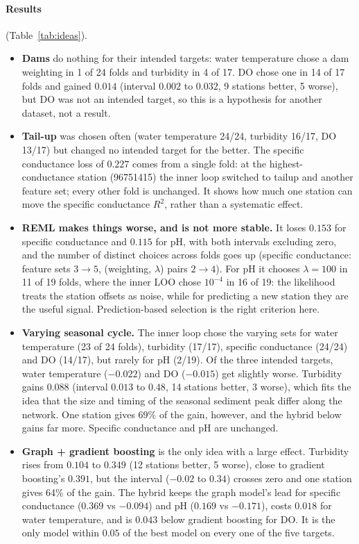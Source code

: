\documentclass[11pt]{article}
\newcommand{\codeus}{\textunderscore\allowbreak}
\newcommand{\code}[1]{{\ttfamily\let\_\codeus #1}}
\begin{document}
\paragraph{Results} (Table~\ref{tab:ideas}).
\begin{itemize}
  \item \textbf{Dams} do nothing for their intended targets: water temperature chose a dam
        weighting in 1 of 24 folds and turbidity in 4 of 17. DO chose one in 14 of 17 folds and
        gained $0.014$ (interval $0.002$ to $0.032$, 9 stations better, 5 worse), but DO was not an
        intended target, so this is a hypothesis for another dataset, not a result.
  \item \textbf{Tail-up} was chosen often (water temperature 24/24, turbidity 16/17, DO 13/17) but
        changed no intended target for the better. The specific conductance loss of $0.227$ comes
        from a single fold: at the highest-conductance station (96751415) the inner loop switched
        to \code{tailup\_1000} and another feature set; every other fold is unchanged. It shows how
        much one station can move the specific conductance $R^2$, rather than a systematic effect.
  \item \textbf{REML makes things worse, and is not more stable.} It loses $0.153$ for specific
        conductance and $0.115$ for pH, with both intervals excluding zero, and the number of
        distinct choices across folds goes up (specific conductance: feature sets $3\to5$,
        (weighting, $\lambda$) pairs $2\to4$). For pH it chooses $\lambda=100$ in 11 of 19 folds,
        where the inner LOO chose $10^{-4}$ in 16 of 19: the likelihood treats the station offsets
        as noise, while for predicting a new station they are the useful signal. Prediction-based
        selection is the right criterion here.
  \item \textbf{Varying seasonal cycle.} The inner loop chose the varying sets for water temperature
        (23 of 24 folds), turbidity (17/17), specific conductance (24/24) and DO (14/17), but rarely
        for pH (2/19). Of the three intended targets, water temperature ($-0.022$) and DO ($-0.015$)
        get slightly worse. Turbidity gains $0.088$ (interval $0.013$ to $0.48$, 14 stations better,
        3 worse), which fits the idea that the size and timing of the seasonal sediment peak differ
        along the network. One station gives 69\% of the gain, however, and the hybrid below gains
        far more. Specific conductance and pH are unchanged.
  \item \textbf{Graph + gradient boosting} is the only idea with a large effect. Turbidity rises from
        $0.104$ to $0.349$ (12 stations better, 5 worse), close to gradient boosting's $0.391$, but
        the interval ($-0.02$ to $0.34$) crosses zero and one station gives 64\% of the gain. The
        hybrid keeps the graph model's lead for specific conductance ($0.369$ vs $-0.094$) and pH
        ($0.169$ vs $-0.171$), costs $0.018$ for water temperature, and is $0.043$ below gradient
        boosting for DO. It is the only model within $0.05$ of the best model on every one of the five
        targets.
\end{itemize}
\end{document}
